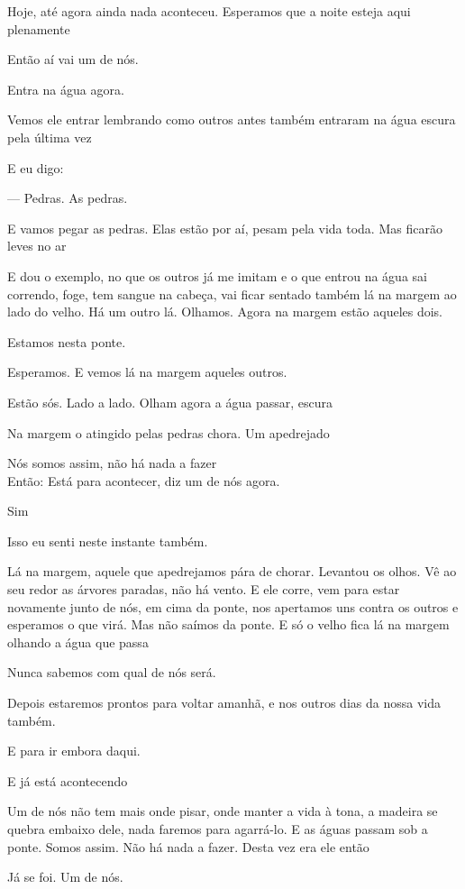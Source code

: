 Hoje, até agora ainda nada aconteceu. Esperamos que a noite esteja aqui
plenamente

Então aí vai um de nós.

Entra na água agora.

Vemos ele entrar lembrando como outros antes também entraram na água
escura pela última vez

E eu digo:

--- Pedras. As pedras.

E vamos pegar as pedras. Elas estão por aí, pesam pela vida toda. Mas
ficarão leves no ar

E dou o exemplo, no que os outros já me imitam e o que entrou na água
sai correndo, foge, tem sangue na cabeça, vai ficar sentado também lá na
margem ao lado do velho. Há um outro lá. Olhamos. Agora na margem estão
aqueles dois.

Estamos nesta ponte.

Esperamos. E vemos lá na margem aqueles outros.

Estão sós. Lado a lado. Olham agora a água passar, escura

Na margem o atingido pelas pedras chora. Um apedrejado

Nós somos assim, não há nada a fazer\\

Então: Está para acontecer, diz um de nós agora.

Sim

Isso eu senti neste instante também.

Lá na margem, aquele que apedrejamos pára de chorar. Levantou os olhos.
Vê ao seu redor as árvores paradas, não há vento. E ele corre, vem para
estar novamente junto de nós, em cima da ponte, nos apertamos uns contra
os outros e esperamos o que virá. Mas não saímos da ponte. E só o velho
fica lá na margem olhando a água que passa

Nunca sabemos com qual de nós será.

Depois estaremos prontos para voltar amanhã, e nos outros dias da nossa
vida também.

E para ir embora daqui.

E já está acontecendo

Um de nós não tem mais onde pisar, onde manter a vida à tona, a madeira
se quebra embaixo dele, nada faremos para agarrá-lo. E as águas passam
sob a ponte. Somos assim. Não há nada a fazer. Desta vez era ele então

Já se foi. Um de nós.

